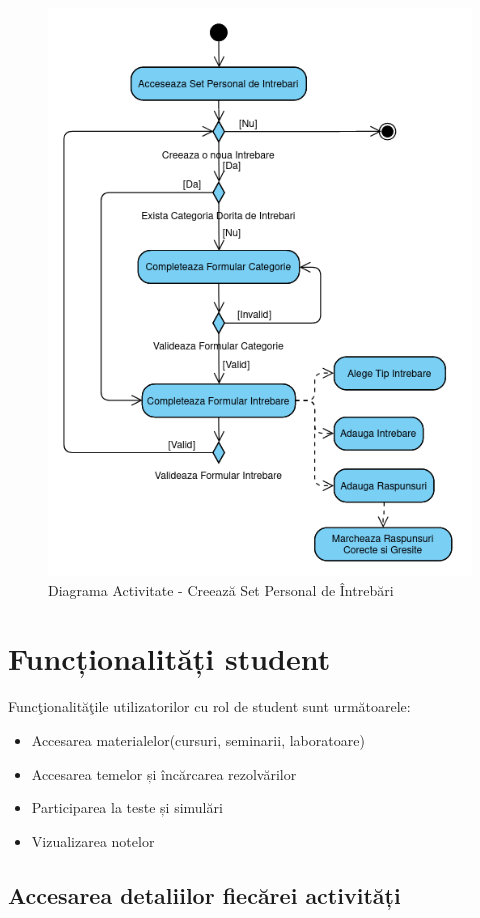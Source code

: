 \documentclass[12pt, a4paper, oneside, romanian]{teza-upb}
\begin{document}
\begin{figure}[H]
\centering
\includegraphics*[width=0.75\columnwidth]{diagrama-activitate-creeaza-set-personal-de-intrebari}
\caption{Diagrama Activitate - Creează Set Personal de Întrebări}
\label{diagrama-activitate-creeaza-set-personal-de-intrebari}
\end{figure}

\section{Funcționalități student}

Funcţionalităţile utilizatorilor cu rol de student sunt următoarele:
\begin{itemize}
	\item Accesarea materialelor(cursuri, seminarii, laboratoare)
	\item Accesarea temelor și încărcarea rezolvărilor
	\item Participarea la teste și simulări
	\item Vizualizarea notelor
\end{itemize}

\subsection{Accesarea detaliilor fiecărei activități}
\end{document}
